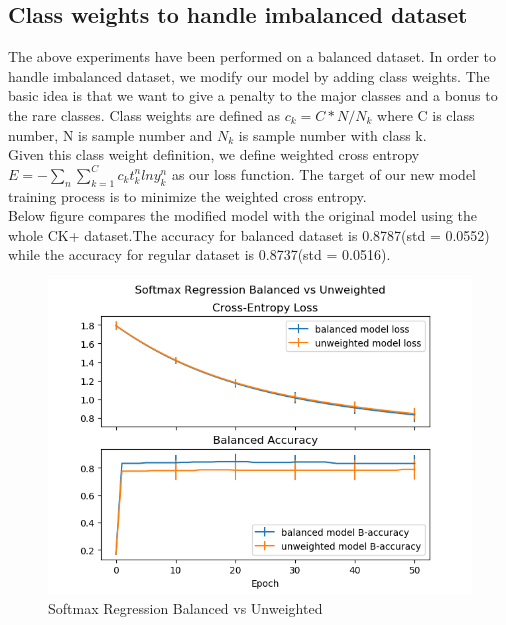 \documentclass{article} %
\begin{document}
\subsection {Class weights to handle imbalanced dataset}
The above experiments have been performed on a balanced dataset. In order to handle imbalanced dataset, we modify our model by adding class weights. The basic idea is that we want to give a penalty to the major classes and a bonus to the rare classes. Class weights are defined as $c_k = C*N/N_k$ where C is class number, N is sample number and $N_k$ is sample number with class k. \\
Given this class weight definition, we define weighted cross entropy $E = -\sum_{n}\sum_{k=1}^{C} c_k t_k^n ln y_k^n $ as our loss function. The target of our new model training process is to minimize the weighted cross entropy. \\
Below figure compares the modified model with the original model using the whole CK+ dataset.The accuracy for balanced dataset is 0.8787(std = 0.0552) while the accuracy for regular dataset is 0.8737(std = 0.0516).
\begin{figure}[h]
	\centering
	\includegraphics[scale=0.5]{./graph/unbalanced.png}
	\caption{Softmax Regression Balanced vs Unweighted}
\end{figure}
\end{document}
